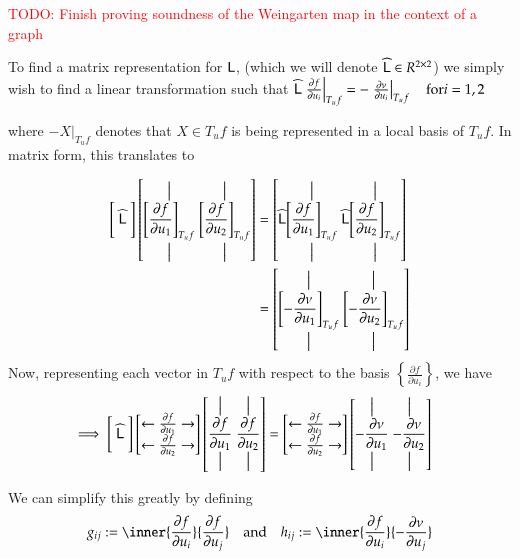 		\textcolor{red}{TODO: Finish proving soundness of the Weingarten map in the context of a graph}
		
		
		To find a matrix representation for $\mathsf{L}$, (which we will denote $\widehat{\mathsf{L}} \in R^{2\times2}$) we simply wish to find a linear transformation
		such that
		$\widehat{\mathsf{L}} \left.\frac{\partial f}{\partial u_i}\right|_{T_u f}
			= - \left.\frac{\partial \nu}{\partial u_i}\right|_{T_u f} \quad \textrm{for} i=1,2$
			
		where $- \left.X\right|_{T_u f}$ denotes that $X \in T_u f$ is being represented in a local basis of $T_u f$. In matrix form, this translates to
		
		\begin{align}
		\Bigg[ \;\widehat{\mathsf{L}}\; \Bigg]
		\left[ \overset{\big\vert}{\underset{\big\vert}{\left[\frac{\partial f}{\partial u_1}\right]_{T_u f}}} \;
				\overset{\big\vert}{\underset{\big\vert}{\left[\frac{\partial f}{\partial u_2}\right]_{T_u f}}} \right]
				&= \left[ \widehat{\mathsf{L}} \overset{\big\vert}{\underset{\big\vert}{\left[\frac{\partial f}{\partial u_1}\right]_{T_u f}}} \;
				\widehat{\mathsf{L}} \overset{\big\vert}{\underset{\big\vert}{\left[\frac{\partial f}{\partial u_2}\right]_{T_u f}}} \right] \\
				&= \left[ \overset{\big\vert}{\underset{\big\vert}{ \left[-\frac{\partial \nu}{\partial u_1}\right]_{T_u f}}} \;
				\overset{\big\vert}{\underset{\big\vert}{\left[-\frac{\partial \nu}{\partial u_2}\right]_{T_u f}}} \right]
				\end{align}
				Now, representing each vector in  $T_u f$ with respect to the basis $\left\{ \frac{\partial f}{\partial u_i}\right\}$, we have
				\begin{align}
				\implies
				\Bigg[ \;\widehat{\mathsf{L}}\; \Bigg]
				\begin{bmatrix} \leftarrow \frac{\partial f}{\partial u_1} \rightarrow \\
								\leftarrow \frac{\partial f}{\partial u_2} \rightarrow
								\end{bmatrix}
				\left[ \overset{\big\vert}{\underset{\big\vert}{\frac{\partial f}{\partial u_1}}} \;
					\overset{\big\vert}{\underset{\big\vert}{\frac{\partial f}{\partial u_2}}}\right]
					&= \begin{bmatrix} \leftarrow \frac{\partial f}{\partial u_1} \rightarrow \\
					\leftarrow \frac{\partial f}{\partial u_2} \rightarrow
					\end{bmatrix}
					\left[ \overset{\big\vert}{\underset{\big\vert}{-\frac{\partial \nu}{\partial u_1}}} \;
					\overset{\big\vert}{\underset{\big\vert}{-\frac{\partial \nu}{\partial u_2}}}\right]
		\end{align}
				 
		We can simplify this greatly by defining 
		\begin{equation}\label{fundamentalformcoefficients}
		g_{ij} := \inner{\frac{\partial f}{\partial u_i}}{\frac{\partial f}{\partial u_j}}
		\quad \textrm{and}\quad
		h_{ij} := \inner{\frac{\partial f}{\partial u_i}}{-\frac{\partial \nu}{\partial u_j}}
		\end{equation}
		
